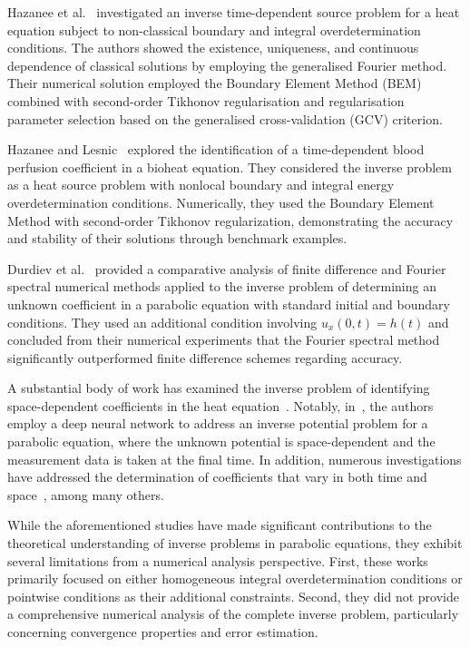\documentclass[reqno]{amsart}
\begin{document}
Hazanee et al.~\cite{Hazanee13} investigated an inverse time-dependent source problem for a heat equation subject to non-classical boundary and integral overdetermination conditions. The authors showed the existence, uniqueness, and continuous dependence of classical solutions by employing the generalised Fourier method. Their numerical solution employed the Boundary Element Method (BEM) combined with second-order Tikhonov regularisation and regularisation parameter selection based on the generalised cross-validation (GCV) criterion.

Hazanee and Lesnic~\cite{Hazanee14} explored the identification of a time-dependent blood perfusion coefficient in a bioheat equation. They considered the inverse problem as a heat source problem with nonlocal boundary and integral energy overdetermination conditions. Numerically, they used the Boundary Element Method with second-order Tikhonov regularization, demonstrating the accuracy and stability of their solutions through benchmark examples.

Durdiev et al.~\cite{Durdiev22} provided a comparative analysis of finite difference and Fourier spectral numerical methods applied to the inverse problem of determining an unknown coefficient in a parabolic equation with standard initial and boundary conditions. They used an additional condition involving $u_x(0,t) = h(t)$ and concluded from their numerical experiments that the Fourier spectral method significantly outperformed finite difference schemes regarding accuracy.

A substantial body of work has examined the inverse problem of identifying space-dependent coefficients in the heat equation~\cite{Isakov91,Rundell87,Ramm01,Yang08,Deng08,Ruzhansky19,Zhang24,Zhang23}. Notably, in~\cite{Zhang23}, the authors employ a deep neural network to address an inverse potential problem for a parabolic equation, where the unknown potential is space-dependent and the measurement data is taken at the final time. In addition, numerous investigations have addressed the determination of coefficients that vary in both time and space~\cite{Deng10,Deng11,Trucu11,Fan21,Mishra21,ARST21c,Purohit25}, among many others.

While the aforementioned studies have made significant contributions to the theoretical understanding of inverse problems in parabolic equations, they exhibit several limitations from a numerical analysis perspective. First, these works primarily focused on either homogeneous integral overdetermination conditions or pointwise conditions as their additional constraints. Second, they did not provide a comprehensive numerical analysis of the complete inverse problem, particularly concerning convergence properties and error estimation.
\end{document}
